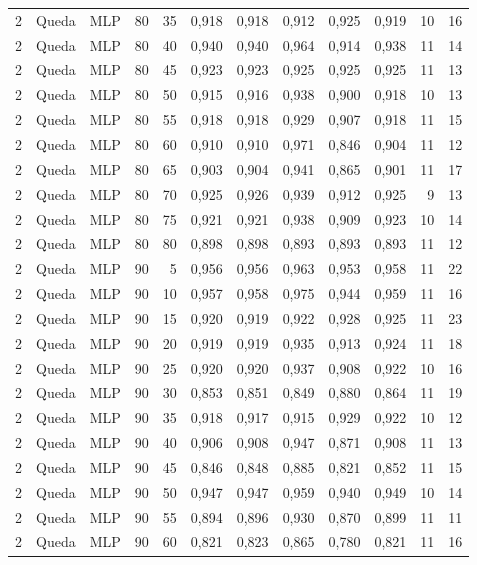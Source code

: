 \begin{longtable}{@{}rllrrrrrrrrr@{}}
2 & Queda & MLP & 80 & 35 & 0,918 & 0,918 & 0,912 & 0,925 & 0,919 & 10 & 16 \\
2 & Queda & MLP & 80 & 40 & 0,940 & 0,940 & 0,964 & 0,914 & 0,938 & 11 & 14 \\
2 & Queda & MLP & 80 & 45 & 0,923 & 0,923 & 0,925 & 0,925 & 0,925 & 11 & 13 \\
2 & Queda & MLP & 80 & 50 & 0,915 & 0,916 & 0,938 & 0,900 & 0,918 & 10 & 13 \\
2 & Queda & MLP & 80 & 55 & 0,918 & 0,918 & 0,929 & 0,907 & 0,918 & 11 & 15 \\
2 & Queda & MLP & 80 & 60 & 0,910 & 0,910 & 0,971 & 0,846 & 0,904 & 11 & 12 \\
2 & Queda & MLP & 80 & 65 & 0,903 & 0,904 & 0,941 & 0,865 & 0,901 & 11 & 17 \\
2 & Queda & MLP & 80 & 70 & 0,925 & 0,926 & 0,939 & 0,912 & 0,925 & 9 & 13 \\
2 & Queda & MLP & 80 & 75 & 0,921 & 0,921 & 0,938 & 0,909 & 0,923 & 10 & 14 \\
2 & Queda & MLP & 80 & 80 & 0,898 & 0,898 & 0,893 & 0,893 & 0,893 & 11 & 12 \\
2 & Queda & MLP & 90 & 5 & 0,956 & 0,956 & 0,963 & 0,953 & 0,958 & 11 & 22 \\
2 & Queda & MLP & 90 & 10 & 0,957 & 0,958 & 0,975 & 0,944 & 0,959 & 11 & 16 \\
2 & Queda & MLP & 90 & 15 & 0,920 & 0,919 & 0,922 & 0,928 & 0,925 & 11 & 23 \\
2 & Queda & MLP & 90 & 20 & 0,919 & 0,919 & 0,935 & 0,913 & 0,924 & 11 & 18 \\
2 & Queda & MLP & 90 & 25 & 0,920 & 0,920 & 0,937 & 0,908 & 0,922 & 10 & 16 \\
2 & Queda & MLP & 90 & 30 & 0,853 & 0,851 & 0,849 & 0,880 & 0,864 & 11 & 19 \\
2 & Queda & MLP & 90 & 35 & 0,918 & 0,917 & 0,915 & 0,929 & 0,922 & 10 & 12 \\
2 & Queda & MLP & 90 & 40 & 0,906 & 0,908 & 0,947 & 0,871 & 0,908 & 11 & 13 \\
2 & Queda & MLP & 90 & 45 & 0,846 & 0,848 & 0,885 & 0,821 & 0,852 & 11 & 15 \\
2 & Queda & MLP & 90 & 50 & 0,947 & 0,947 & 0,959 & 0,940 & 0,949 & 10 & 14 \\
2 & Queda & MLP & 90 & 55 & 0,894 & 0,896 & 0,930 & 0,870 & 0,899 & 11 & 11 \\
2 & Queda & MLP & 90 & 60 & 0,821 & 0,823 & 0,865 & 0,780 & 0,821 & 11 & 16 \\

\end{longtable}

